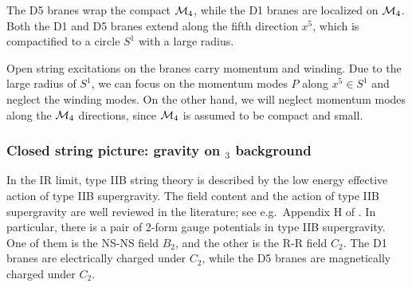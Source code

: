 \documentclass[11pt,a4paper]{article}
\newcommand{\ads}[1]{\text{AdS}\ensuremath{_{#1}}}
\begin{document}
	The D5 branes wrap the compact $\mathcal{M}_4$, while the D1 branes are localized on $\mathcal{M}_4$. Both the D1 and D5 branes extend along the fifth direction $x^5$, which is compactified to a circle $S^1$ with a large radius. 
	
	Open string excitations on the branes carry momentum and winding. Due to the large radius of $S^1$, we can focus on the momentum modes $P$ along $x^5 \in S^1$ and neglect the winding modes. On the other hand, we will neglect momentum modes along the $\mathcal{M}_4$ directions, since $\mathcal{M}_4$ is assumed to be compact and small. 
	
\subsubsection{Closed string picture: gravity on \ads{3} background}
	In the IR limit, type IIB string theory is described by the low energy effective action of type IIB supergravity. The field content and the action of type IIB supergravity are well reviewed in the literature; see e.g.\ Appendix H of \cite{Kiritsis:1997hj}. In particular, there is a pair of 2-form gauge potentials in type IIB supergravity. One of them is the NS-NS field $B_2$, and the other is the R-R field $C_2$. 
	The D1 branes are electrically charged under $C_2$, while the D5 branes are magnetically charged under $C_2$. 
	
\end{document}
